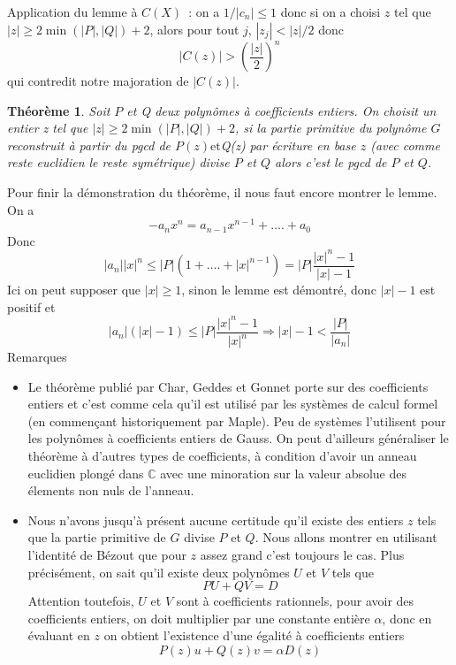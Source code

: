 \documentclass[a4paper,11pt]{book}
\newtheorem{thm}{Théorème}
\begin{document}
\begin{giacjshere}
Application du lemme à $C(X)$~: on a $1/|c_n|\leq 1$
donc si on a choisi $z$ tel que $| z | \geq 2 \min ( | P |, | Q | ) + 2$,
alors pour tout $j$, $| z_j | < | z | / 2$ donc
\[ | C ( z ) | > \left( \frac{| z |}{2} \right)^n \]
qui contredit notre majoration de $| C ( z ) |$.

\begin{thm}
  Soit $P$ et Q deux polynômes à coefficients entiers. On
  choisit un entier z tel que $| z | \geq 2 \min ( | P |, | Q | ) + 2$,
  si la partie primitive du polynôme $G$ reconstruit à partir du pgcd de $P (
  z ) \mbox{et}$Q(z) par écriture en base $z$ (avec comme reste euclidien le
  reste symétrique) divise $P$ et $Q$ alors c'est le pgcd de $P$ et $Q$.
\end{thm}

Pour finir la démonstration du théorème, il nous faut encore montrer le lemme.
On a
\[ - a_n x^n = a_{n - 1} x^{n - 1} + \ldots . + a_0 \]
Donc
\[ | a_n | | x |^n \leq | P | ( 1 + \ldots . + | x |^{n - 1} ) = | P |
   \frac{| x |^n - 1}{| x | - 1} \]
Ici on peut supposer que $| x | \geq 1$, sinon le lemme est démontré,
donc $| x | - 1$ est positif et
\[ | a_n | ( | x | - 1 ) \leq | P | \frac{| x |^n - 1}{| x |^n}
   \Rightarrow | x | - 1 < \frac{| P |}{| a_n |} \]
Remarques
\begin{itemize}
  \item Le théorème publié par Char, Geddes et Gonnet 
  porte sur des coefficients entiers et
  c'est comme cela qu'il est utilisé par les systèmes de calcul formel (en
  commençant historiquement par Maple). Peu de systèmes l'utilisent pour les
  polynômes à coefficients entiers de Gauss. On peut d'ailleurs généraliser le
  théorème à d'autres types de coefficients, à condition d'avoir un anneau
  euclidien plongé dans $\mathbb{C}$ avec une minoration sur la valeur absolue
  des élements non nuls de l'anneau.
  
  \item Nous n'avons jusqu'à présent aucune certitude qu'il existe des entiers
  $z$ tels que la partie primitive de $G$ divise $P$ et $Q$. Nous allons
  montrer en utilisant l'identité de Bézout que pour $z$ assez grand c'est
  toujours le cas. Plus précisément, on sait qu'il existe deux polynômes $U$
  et $V$ tels que
  \[ P U + Q V = D \]
  Attention toutefois, $U$ et $V$ sont à coefficients rationnels, pour avoir
  des coefficients entiers, on doit multiplier par une constante entière
  $\alpha$, donc en évaluant en $z$ on obtient l'existence d'une égalité à
  coefficients entiers
  \[ P ( z ) u + Q ( z ) v = \alpha D ( z ) \]
  

\end{itemize}
\end{giacjshere}
\end{document}
